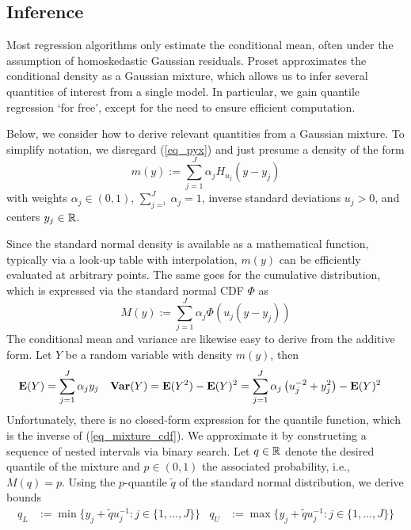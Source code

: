 \subsection{Inference}
\label{sec_inference}
%
Most regression algorithms only estimate the conditional mean, often under the assumption of homoskedastic Gaussian residuals.
Proset approximates the conditional density as a Gaussian mixture, which allows us to infer several quantities of interest from a single model.
In particular, we gain quantile regression `for free', except for the need to ensure efficient computation.\par
%
Below, we consider how to derive relevant quantities from a Gaussian mixture.
To simplify notation, we disregard (\ref{eq_pyx}) and just presume a density of the form
%
\begin{equation}
m(y):=\sum_{j=1}^J\alpha_jH_{u_j}(y-y_j)\label{eq_mixture_pdf}
\end{equation}
%
with weights $\alpha_j\in(0,1)$, $\sum_{j=^1}^J\alpha_j=1$, inverse standard deviations $u_j>0$, and centers $y_j\in\mathbb{R}$.\par
%
Since the standard normal density is available as a mathematical function, typically via a look-up table with interpolation, $m(y)$ can be efficiently evaluated at arbitrary points.
The same goes for the cumulative distribution, which is expressed via the standard normal CDF $\Phi$ as
%
\begin{equation}
M(y):=\sum_{j=1}^J\alpha_j\Phi(u_j(y-y_j))\label{eq_mixture_cdf}
\end{equation}
%
The conditional mean and variance are likewise easy to derive from the additive form.
Let $Y$ be a random variable with density $m(y)$, then
%
\begin{align}
\mathbf{E}(Y)&=\sum_{j=1}^J\alpha_jy_j&
\mathbf{Var}(Y)&=\mathbf{E}(Y^2)-\mathbf{E}(Y)^2=\sum_{j=1}^J\alpha_j\left(u_j^{-2}+y_j^2\right)-\mathbf{E}(Y)^2\label{eq_moments}
\end{align}
%
Unfortunately, there is no closed-form expression for the quantile function, which is the inverse of (\ref{eq_mixture_cdf}).
We approximate it by constructing a sequence of nested intervals via binary search.
Let $q\in\mathbb{R}$ denote the desired quantile of the mixture and $p\in(0,1)$ the associated probability, i.e., $M(q)=p$.
Using the $p$-quantile $\tilde{q}$ of the standard normal distribution, we derive bounds
%
\begin{align}
q_L&:=\min\{y_j+\tilde{q}u_j^{-1}:j\in\{1,\dots,J\}\}&
q_U&:=\max\{y_j+\tilde{q}u_j^{-1}:j\in\{1,\dots,J\}\}
\label{eq_quantile_bounds}
\end{align}

